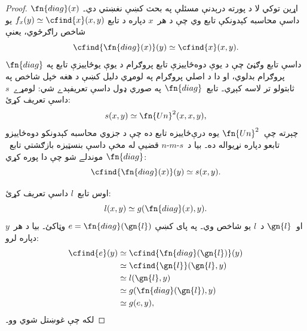 \documentclass[../../../include/open-logic-section]{subfiles}
\begin{document}
\begin{proof}
اړين توکي لا د پورته درېدنې مسئلې په بحث کښې نغښتي دي۔
$\fn{diag}(x)$ داسې محاسبه کېدونکې تابع وي چې د هر~$x$ دپاره د تابع
$f_x(y) \simeq \cfind{x}(x,y)$ يو شاخص راګرځوي، يعنې
\[
\cfind{\fn{diag}(x)}(y) \simeq \cfind{x}(x,y).
\]
$\fn{diag}$ داسې تابع وګڼئ چې د يوې دوه‌ځاييزې تابع پروګرام د يوې
يوځاييزې تابع په پروګرام بدلوي، او دا د اصلي پروګرام په لومړي دليل
کښې د هغه خپل شاخص په ثابتولو تر لاسه کېږي۔ تابع~$\fn{diag}$ په صوري
ډول داسې تعريفېدے شي: لومړے~$s$ داسې تعريف کړئ:
\[
s(x,y) \simeq \fn{Un}^2(x,x,y),
\]
چېرته چې~$\fn{Un}^2$ يوه درې‌ځاييزه تابع ده چې د جزوي محاسبه
کېدونکو دوه‌ځاييزو تابعو دپاره نړيواله ده۔ بيا د~$s$-$m$-$n$ قضيې
له مخې داسې بنسټيزه بازګشتي تابع~$\fn{diag}$ موندلے شو چې دا پوره
کړي:
\[
\cfind{\fn{diag}(x)}(y) \simeq s(x,y).
\]

اوس تابع~$l$ داسې تعريف کړئ:
\[
l(x,y) \simeq g(\fn{diag}(x),y).
\]
او~$\gn{l}$ د~$l$ يو شاخص وي۔ په پای کښې
$e = \fn{diag}(\gn{l})$ وټاکئ۔ بيا د هر~$y$ دپاره لرو:
\begin{align*}
\cfind{e}(y) & \simeq \cfind{\fn{diag}(\gn{l})}(y) \\
& \simeq \cfind{\gn{l}}(\gn{l}, y) \\
& \simeq l(\gn{l}, y) \\
& \simeq g(\fn{diag}(\gn{l}),y) \\
& \simeq g(e, y),
\end{align*}
لکه چې غوښتل شوي وو۔
\end{proof}
\end{document}
